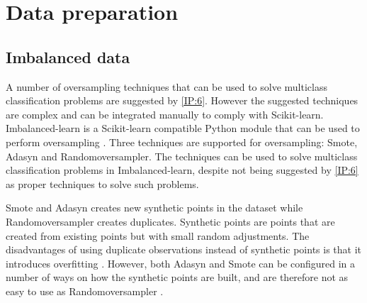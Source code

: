 	
\section{Data preparation}
	
	\subsection{Imbalanced data} \label{sec:imbalancedtheory}
	A number of oversampling techniques that can be used to solve multiclass classification problems are suggested by \ref{IP:6}. However the suggested techniques are complex and can be integrated manually to comply with Scikit-learn. Imbalanced-learn is a Scikit-learn compatible Python module that can be used to perform oversampling \cite{WEBSITE:22}. Three techniques are supported for oversampling: Smote, Adasyn and Randomoversampler. The techniques can be used to solve multiclass classification problems in Imbalanced-learn, despite not being suggested by \ref{IP:6} as proper techniques to solve such problems. 

Smote and Adasyn creates new synthetic points in the dataset while Randomoversampler creates duplicates. Synthetic points are points that are created from existing points but with small random adjustments. The disadvantages of using duplicate observations instead of synthetic points is that it introduces overfitting \cite{BOOK:12}. However, both Adasyn and Smote can be configured in a number of ways on how the synthetic points are built, and are therefore not as easy to use as Randomoversampler \cite{WEBSITE:23}. 





